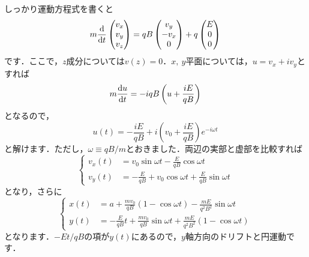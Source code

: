 \documentclass[a4paper,pdflatex,ja=standard]{bxjsarticle}
\begin{document}
\begin{enumerate}
  しっかり運動方程式を書くと
  \begin{equation}
    m\dv{}{t}
    \begin{pmatrix}
      v_x \\
      v_y \\
      v_z
    \end{pmatrix}
    =
    qB
    \begin{pmatrix}
      v_y \\
      -v_x \\
      0
    \end{pmatrix}
    +
    q
    \begin{pmatrix}
      E \\
      0 \\
      0
    \end{pmatrix}
  \end{equation}
  です．ここで，$z$成分については$v(z)=0$．$x,\ y$平面については，$u=v_x+iv_y$とすれば
  \begin{equation}
    m\dv{u}{t}
    =
    -iqB\left(  
      u+\frac{iE}{qB}
    \right)
  \end{equation}
  となるので，
  \begin{equation}
    u(t)
    =
    -
    \frac{iE}{qB}
    +
    i\left(  
      v_0+\frac{iE}{qB}
    \right)
    e^{-i\omega t}
  \end{equation}
  と解けます．ただし，$\omega\equiv qB/m$とおきました．両辺の実部と虚部を比較すれば
  \begin{equation}
    \left\{
      \begin{alignedat}{1}
        v_x(t)
        &=
        v_0\sin \omega t
        -
        \frac{E}{qB}\cos \omega t
        \\
        v_y(t)
        &=
        -\frac{E}{qB}
        +
        v_0\cos \omega t
        +
        \frac{E}{qB}\sin \omega t
      \end{alignedat}
    \right.
    \label{sol_v}
  \end{equation}
  となり，さらに
  \begin{equation}
    \left\{
      \begin{alignedat}{1}
        x(t)
        &=
        a
        +
        \frac{mv_0}{qB}
        (1-\cos\omega t)
        -
        \frac{mE}{q^2B^2}
        \sin\omega t
        \\
        y(t)
        &=
        -\frac{E}{qB}t
        +
        \frac{mv_0}{qB}\sin\omega t
        +
        \frac{mE}{q^2B^2}
        (1-\cos\omega t)        
      \end{alignedat}
    \right.
    \label{sol_x}
  \end{equation}
  となります．$-Et/qB$の項が$y(t)$にあるので，$y$軸方向のドリフトと円運動です．



\end{enumerate}
\end{document}
